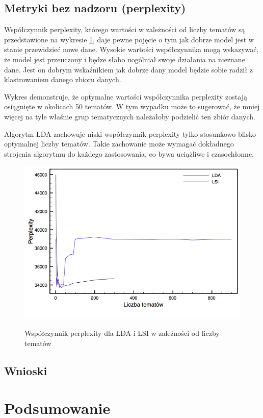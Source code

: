 \documentclass[11pt,a4paper]{article}
\begin{document}
\FloatBarrier

\subsection{Metryki bez nadzoru (perplexity)}

Współczynnik perplexity, którego wartości w zależności od liczby tematów są
przedstawione na wykresie \ref{fig:perplexity}, daje pewne pojęcie o tym jak
dobrze model jest w stanie przewidzieć nowe dane. Wysokie wartości
współczynnika mogą wskazywać, że model jest przeuczony i będze słabo uogólniał
swoje działania na nieznane dane. Jest on dobrym wskaźnikiem jak dobrze dany
model będzie sobie radził z klastrowaniem danego zbioru danych.

Wykres demonstruje, że optymalne wartości współczynnika perplexity zostają
osiągnięte w okolicach 50 tematów. W tym wypadku może to sugerować, że mniej
więcej na tyle właśnie grup tematycznych należałoby podzielić ten zbiór danych.

Algorytm LDA zachowuje niski współczynnik perplexity tylko stosunkowo blisko
optymalnej liczby tematów. Takie zachowanie może wymagać dokładnego strojenia
algorytmu do każdego zastosowania, co bywa uciążliwe i czasochłonne.

\begin{figure}[h]
\caption{Współczynnik perplexity dla LDA i LSI w zależności od liczby tematów}
\includegraphics[width=\linewidth]{gfx/perplexity.png}
\label{fig:perplexity}
\end{figure}

\FloatBarrier

\subsection{Wnioski}

\section{Podsumowanie}




\enddocument
\end{document}
